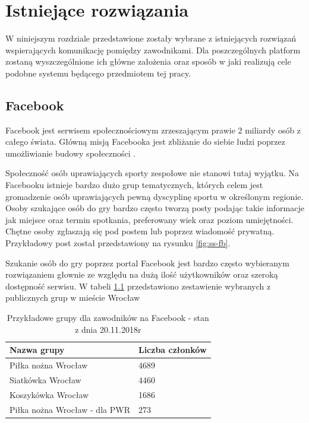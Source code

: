 \chapter{Istniejące rozwiązania}

W niniejszym rozdziale przedstawione zostały wybrane z istniejących rozwiązań wspierających komunikację pomiędzy zawodnikami. Dla poszczególnych platform zostaną wyszczególnione ich główne założenia oraz sposób w jaki realizują cele podobne systemu będącego przedmiotem tej pracy.


\section{Facebook}

Facebook jest serwisem społecznościowym zrzeszającym prawie 2 miliardy osób z całego świata. Główną misją Facebooka jest zbliżanie do siebie ludzi poprzez umożliwianie budowy społeczności \cite{fb}.

Społeczność osób uprawiających sporty zespołowe nie stanowi tutaj wyjątku. Na Facebooku istnieje bardzo dużo grup tematycznych, których celem jest gromadzenie osób uprawiających pewną dyscyplinę sportu w określonym regionie. Osoby szukające osób do gry bardzo często tworzą posty podając takie informacje jak miejsce oraz termin spotkania, preferowany wiek oraz poziom umiejętności. Chętne osoby zgłaszają się pod postem lub poprzez wiadomość prywatną. Przykładowy post został przedstawiony na rysunku \ref{fig:ss-fb}.

Szukanie osób do gry poprzez portal Facebook jest bardzo często wybieranym rozwiązaniem głownie ze względu na dużą ilość użytkowników oraz szeroką dostępność serwisu. W tabeli \ref{tab:fbgrupy} przedstawiono zestawienie wybranych z publicznych grup w mieście Wrocław


\begin{table}[htb]
\centering\small
\caption{Przykładowe grupy dla zawodników na Facebook - stan z dnia 20.11.2018r}
\label{tab:fbgrupy}
\begin{tabularx}{\linewidth}{|p{.55\linewidth}|X|}\hline
Nazwa grupy & Liczba członków \\ \hline\hline
Piłka nożna Wrocław & 4689  \\ \hline
Siatkówka Wrocław & 4460  \\ \hline
Koszykówka Wrocław & 1686 \\ \hline
Piłka nożna Wrocław - dla PWR & 273  \\ \hline
\end{tabularx}
\end{table}


